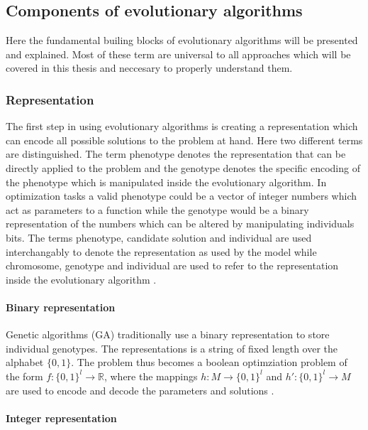 \subsection{Components of evolutionary algorithms}

Here the fundamental builing blocks of evolutionary algorithms will be presented and explained. Most of these term are universal to all approaches which will be covered in this thesis and neccesary to properly understand them.

\subsubsection{Representation}

The first step in using evolutionary algorithms is creating a representation which can encode all possible solutions to the problem at hand. Here two different terms are distinguished. The term phenotype denotes the representation that can be directly applied to the problem and the genotype denotes the specific encoding of the phenotype which is manipulated inside the evolutionary algorithm. In optimization tasks a valid phenotype could be a vector of integer numbers which act as parameters to a function while the genotype would be a binary representation of the numbers which can be altered by manipulating individuals bits. The terms phenotype, candidate solution and individual are used interchangably to denote the representation as used by the model while chromosome, genotype and individual are used to refer to the representation inside the evolutionary algorithm \cite{Eiben2015_whatevolutionary}.

\paragraph{Binary representation}

Genetic algorithms (GA) traditionally use a binary representation to store individual genotypes. The representations is a string of fixed length over the alphabet $\{0,1\}$. The problem thus becomes a boolean optimziation problem of the form $ f:\{0,1\}^l \rightarrow \mathbb{R}$, where the mappings $h:M \rightarrow \{0,1\}^l$ and $h':\{0,1\}^l \rightarrow M$ are used to encode and decode the parameters and solutions \cite{back1997evolutionary}.

\paragraph{Integer representation}

